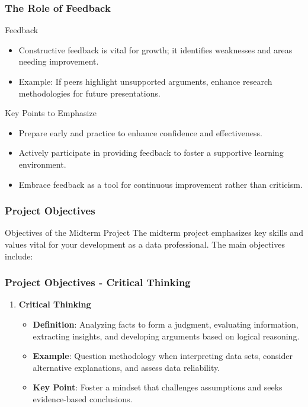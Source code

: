 \documentclass[aspectratio=169]{beamer}
\begin{document}
\begin{frame}[fragile]
    \frametitle{The Role of Feedback}
    
    \begin{block}{Feedback}
        \begin{itemize}
            \item Constructive feedback is vital for growth; it identifies weaknesses and areas needing improvement.
            \item Example: If peers highlight unsupported arguments, enhance research methodologies for future presentations.
        \end{itemize}
    \end{block}

    \begin{block}{Key Points to Emphasize}
        \begin{itemize}
            \item Prepare early and practice to enhance confidence and effectiveness.
            \item Actively participate in providing feedback to foster a supportive learning environment.
            \item Embrace feedback as a tool for continuous improvement rather than criticism.
        \end{itemize}
    \end{block}
\end{frame}

\begin{frame}[fragile]
    \frametitle{Project Objectives}
    \begin{block}{Objectives of the Midterm Project}
        The midterm project emphasizes key skills and values vital for your development as a data professional. 
        The main objectives include:
    \end{block}
\end{frame}

\begin{frame}[fragile]
    \frametitle{Project Objectives - Critical Thinking}
    \begin{enumerate}
        \item \textbf{Critical Thinking}
        \begin{itemize}
            \item \textbf{Definition}: Analyzing facts to form a judgment, evaluating information, extracting insights, and developing arguments based on logical reasoning.
            \item \textbf{Example}: Question methodology when interpreting data sets, consider alternative explanations, and assess data reliability.
            \item \textbf{Key Point}: Foster a mindset that challenges assumptions and seeks evidence-based conclusions.
        \end{itemize}
    \end{enumerate}
\end{frame}
\end{document}
